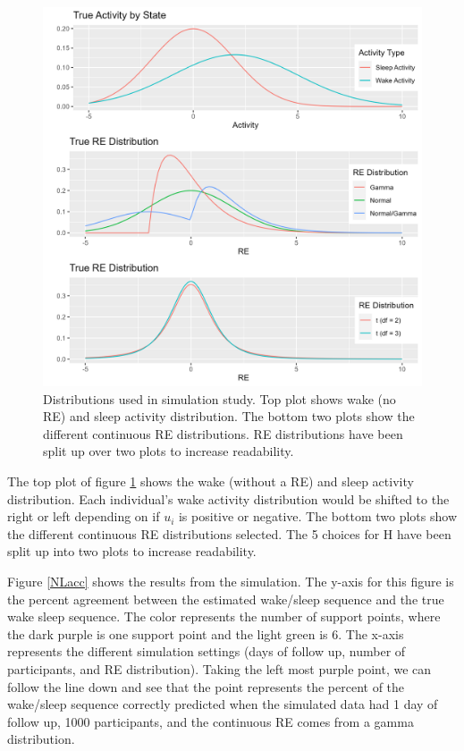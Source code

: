 \documentclass{article}
\begin{document}
\begin{figure}
\includegraphics[scale=.5]{Support/REdist.png}
\centering
\caption{Distributions used in simulation study. Top plot shows wake 
(no RE) and sleep activity distribution. The bottom two plots show the 
different continuous RE distributions. RE distributions have been split 
up over two plots to increase readability.}
\label{REdist}
\end{figure}

The top plot of figure \ref{REdist} shows the wake (without a RE) and 
sleep activity distribution. Each individual's wake activity distribution 
would be shifted to the right or left depending on if $u_i$ is positive 
or negative. The bottom two plots show the different continuous RE 
distributions selected. The 5 choices for H have been split up into 
two plots to increase readability.

Figure \ref{NLacc} shows the results from the simulation. The y-axis 
for this figure is the percent agreement between the estimated wake/sleep 
sequence and the true wake sleep sequence. The color represents the 
number of support points, where the dark purple is one support point 
and the light green is 6. The x-axis represents the different simulation
settings (days of follow up, number of participants, and RE distribution). 
Taking the left most purple point, we can follow the line down and see 
that the point represents the percent of the wake/sleep sequence 
correctly predicted when the simulated data had 1 day of follow up, 1000 
participants, and the continuous RE comes from a gamma distribution.
\end{document}

